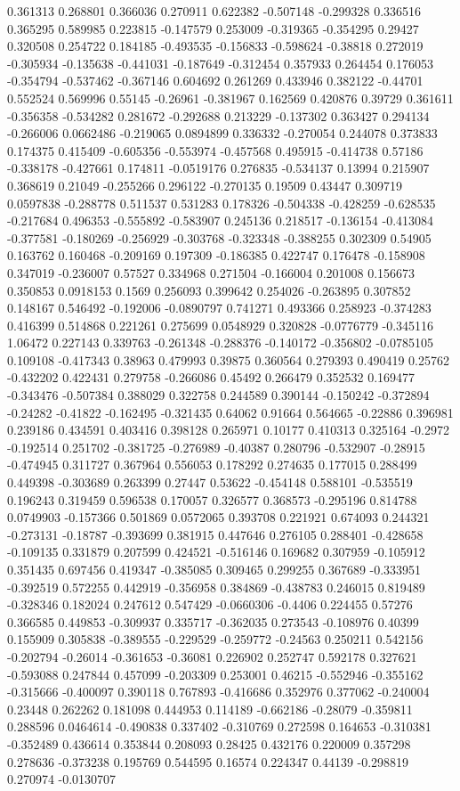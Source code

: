 0.361313 0.268801 0.366036 0.270911 0.622382 -0.507148 -0.299328 0.336516 0.365295 0.589985 0.223815 -0.147579 0.253009 -0.319365 -0.354295 0.29427 0.320508 0.254722 0.184185 -0.493535 -0.156833 -0.598624 -0.38818 0.272019 -0.305934 -0.135638 -0.441031 -0.187649 -0.312454 0.357933 0.264454 0.176053 -0.354794 -0.537462 -0.367146 0.604692 0.261269 0.433946 0.382122 -0.44701 0.552524 0.569996 0.55145 -0.26961 -0.381967 0.162569 0.420876 0.39729 0.361611 -0.356358 -0.534282 0.281672 -0.292688 0.213229 -0.137302 0.363427 0.294134 -0.266006 0.0662486 -0.219065 0.0894899 0.336332 -0.270054 0.244078 0.373833 0.174375 0.415409 -0.605356 -0.553974 -0.457568 0.495915 -0.414738 0.57186 -0.338178 -0.427661 0.174811 -0.0519176 0.276835 -0.534137 0.13994 0.215907 0.368619 0.21049 -0.255266 0.296122 -0.270135 0.19509 0.43447 0.309719 0.0597838 -0.288778 0.511537 0.531283 0.178326 -0.504338 -0.428259 -0.628535 -0.217684 0.496353 -0.555892 -0.583907 0.245136 0.218517 -0.136154 -0.413084 -0.377581 -0.180269 -0.256929 -0.303768 -0.323348 -0.388255 0.302309 0.54905 0.163762 0.160468 -0.209169 0.197309 -0.186385 0.422747 0.176478 -0.158908 0.347019 -0.236007 0.57527 0.334968 0.271504 -0.166004 0.201008 0.156673 0.350853 0.0918153 0.1569 0.256093 0.399642 0.254026 -0.263895 0.307852 0.148167 0.546492 -0.192006 -0.0890797 0.741271 0.493366 0.258923 -0.374283 0.416399 0.514868 0.221261 0.275699 0.0548929 0.320828 -0.0776779 -0.345116 1.06472 0.227143 0.339763 -0.261348 -0.288376 -0.140172 -0.356802 -0.0785105 0.109108 -0.417343 0.38963 0.479993 0.39875 0.360564 0.279393 0.490419 0.25762 -0.432202 0.422431 0.279758 -0.266086 0.45492 0.266479 0.352532 0.169477 -0.343476 -0.507384 0.388029 0.322758 0.244589 0.390144 -0.150242 -0.372894 -0.24282 -0.41822 -0.162495 -0.321435 0.64062 0.91664 0.564665 -0.22886 0.396981 0.239186 0.434591 0.403416 0.398128 0.265971 0.10177 0.410313 0.325164 -0.2972 -0.192514 0.251702 -0.381725 -0.276989 -0.40387 0.280796 -0.532907 -0.28915 -0.474945 0.311727 0.367964 0.556053 0.178292 0.274635 0.177015 0.288499 0.449398 -0.303689 0.263399 0.27447 0.53622 -0.454148 0.588101 -0.535519 0.196243 0.319459 0.596538 0.170057 0.326577 0.368573 -0.295196 0.814788 0.0749903 -0.157366 0.501869 0.0572065 0.393708 0.221921 0.674093 0.244321 -0.273131 -0.18787 -0.393699 0.381915 0.447646 0.276105 0.288401 -0.428658 -0.109135 0.331879 0.207599 0.424521 -0.516146 0.169682 0.307959 -0.105912 0.351435 0.697456 0.419347 -0.385085 0.309465 0.299255 0.367689 -0.333951 -0.392519 0.572255 0.442919 -0.356958 0.384869 -0.438783 0.246015 0.819489 -0.328346 0.182024 0.247612 0.547429 -0.0660306 -0.4406 0.224455 0.57276 0.366585 0.449853 -0.309937 0.335717 -0.362035 0.273543 -0.108976 0.40399 0.155909 0.305838 -0.389555 -0.229529 -0.259772 -0.24563 0.250211 0.542156 -0.202794 -0.26014 -0.361653 -0.36081 0.226902 0.252747 0.592178 0.327621 -0.593088 0.247844 0.457099 -0.203309 0.253001 0.46215 -0.552946 -0.355162 -0.315666 -0.400097 0.390118 0.767893 -0.416686 0.352976 0.377062 -0.240004 0.23448 0.262262 0.181098 0.444953 0.114189 -0.662186 -0.28079 -0.359811 0.288596 0.0464614 -0.490838 0.337402 -0.310769 0.272598 0.164653 -0.310381 -0.352489 0.436614 0.353844 0.208093 0.28425 0.432176 0.220009 0.357298 0.278636 -0.373238 0.195769 0.544595 0.16574 0.224347 0.44139 -0.298819 0.270974 -0.0130707 
